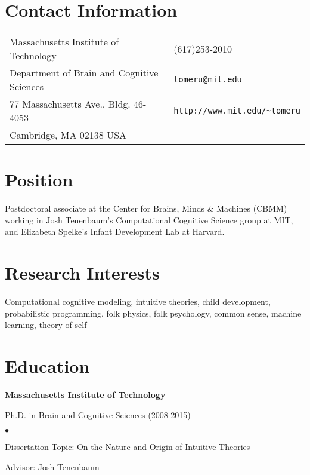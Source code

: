 \documentclass[margin,line,pifont,palatino,courier]{res}
\newenvironment{list1}{
  \begin{list}{\ding{113}}{%
      \setlength{\itemsep}{0in}
      \setlength{\parsep}{0in} \setlength{\parskip}{0in}
      \setlength{\topsep}{0in} \setlength{\partopsep}{0in}
      \setlength{\leftmargin}{0.17in}}}{\end{list}}
\newenvironment{list2}{
  \begin{list}{$\bullet$}{%
      \setlength{\itemsep}{0in}
      \setlength{\parsep}{0in} \setlength{\parskip}{0in}
      \setlength{\topsep}{0in} \setlength{\partopsep}{0in}
      \setlength{\leftmargin}{0.2in}}}{\end{list}}
\begin{document}

\begin{resume}

\section{\sc Contact Information}

\vspace{.05in}
\begin{tabular}{@{}p{2.75in}p{2in}}
Massachusetts Institute of Technology & (617)253-2010 \\
Department of Brain and Cognitive Sciences                        & \verb+tomeru@mit.edu+\\
77 Massachusetts Ave., Bldg. 46-4053            & \verb+http://www.mit.edu/~tomeru+\\
Cambridge, MA 02138 USA               & \\
\end{tabular}

\section{\sc Position}
Postdoctoral associate at the Center for Brains, Minds \& Machines (CBMM) working in Josh Tenenbaum's Computational Cognitive Science group at MIT, and Elizabeth Spelke's Infant Development Lab at Harvard. 

\section{\sc Research Interests}
Computational cognitive modeling, intuitive theories, child development, probabilistic programming, folk physics, folk psychology, common sense, machine learning, theory-of-self

\section{\sc Education}

{\bf Massachusetts Institute of Technology}\\
\vspace*{-.1in}
\begin{list1}
\item[] Ph.D. in Brain and Cognitive Sciences (2008-2015)

\begin{list2}
\vspace*{.05in}
\item Dissertation Topic:  On the Nature and Origin of Intuitive Theories
\item Advisor: Josh Tenenbaum
\end{list2}
\end{list1}


\end{resume}
\end{document}
